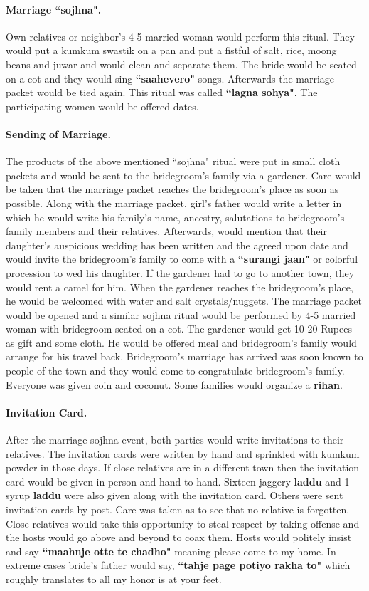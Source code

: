 \paragraph{Marriage ``sojhna".} Own relatives or neighbor's 4-5 married woman
would perform this ritual. They would put a kumkum swastik on a pan and put a
fistful of salt, rice, moong beans and juwar and would clean and separate them.
The bride would be seated on a cot and they would sing \textbf{``saahevero"}
songs. Afterwards the marriage packet would be tied again. This ritual was
called \textbf{``lagna sohya"}. The participating women would be offered dates.

\paragraph{Sending of Marriage.} The products of the above mentioned ``sojhna"
ritual were put in small cloth packets and would be sent to the bridegroom's family
via a gardener. Care would be taken that the marriage packet reaches the
bridegroom's place as soon as possible. Along with the marriage packet, girl's
father would write a letter in which he would write his family's name,
ancestry, salutations to bridegroom's family members and their relatives.
Afterwards, would mention that their daughter's auspicious wedding has been
written and the agreed upon date and would invite the bridegroom's family to come
with a \textbf{``surangi jaan"} or colorful procession to wed his daughter. If
the gardener had to go to another town, they would rent a camel for him. When
the gardener reaches the bridegroom's place, he would be welcomed with water and
salt crystals/nuggets. The marriage packet would be opened and a similar sojhna
ritual would be performed by 4-5 married woman with bridegroom seated on a cot. The
gardener would get 10-20 Rupees as gift and some cloth. He would be offered
meal and bridegroom's family would arrange for his travel back. Bridegroom's marriage has
arrived was soon known to people of the town and they would come to
congratulate bridegroom's family. Everyone was given coin and coconut. Some families
would organize a \textbf{rihan}.

\paragraph{Invitation Card.} After the marriage sojhna event, both parties would
write invitations to their relatives. The invitation cards were written by hand
and sprinkled with kumkum powder in those days. If close relatives are in a
different town then the invitation card would be given in person and
hand-to-hand. Sixteen jaggery \textbf{laddu} and 1 syrup \textbf{laddu} were
also given along with the invitation card. Others were sent invitation cards by
post. Care was taken as to see that no relative is forgotten. Close relatives
would take this opportunity to steal respect by taking offense and the hosts
would go above and beyond to coax them. Hosts would politely insist and say
\textbf{``maahnje otte te chadho"} meaning please come to my home. In extreme
cases bride's father would say, \textbf{``tahje page potiyo rakha to"} which
roughly translates to all my honor is at your feet.

